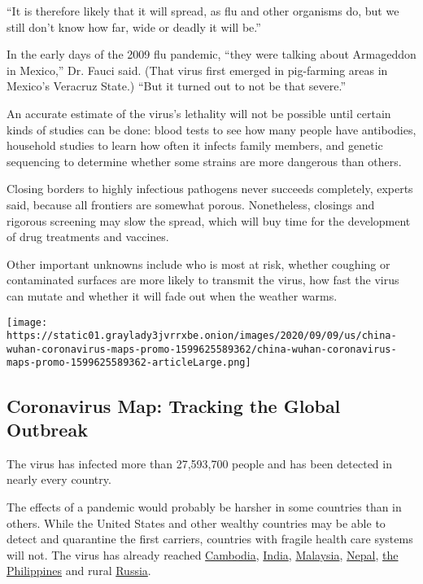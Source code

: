 ``It is therefore likely that it will spread, as flu and other organisms
do, but we still don't know how far, wide or deadly it will be.''

In the early days of the 2009 flu pandemic, ``they were talking about
Armageddon in Mexico,'' Dr. Fauci said. (That virus first emerged in
pig-farming areas in Mexico's Veracruz State.) ``But it turned out to
not be that severe.''

An accurate estimate of the virus's lethality will not be possible until
certain kinds of studies can be done: blood tests to see how many people
have antibodies, household studies to learn how often it infects family
members, and genetic sequencing to determine whether some strains are
more dangerous than others.

Closing borders to highly infectious pathogens never succeeds
completely, experts said, because all frontiers are somewhat porous.
Nonetheless, closings and rigorous screening may slow the spread, which
will buy time for the development of drug treatments and vaccines.

Other important unknowns include who is most at risk, whether coughing
or contaminated surfaces are more likely to transmit the virus, how fast
the virus can mutate and whether it will fade out when the weather
warms.

\href{https://www.nytimes3xbfgragh.onion/interactive/2020/world/coronavirus-maps.html}{}

\texttt{[image: https://static01.graylady3jvrrxbe.onion/images/2020/09/09/us/china-wuhan-coronavirus-maps-promo-1599625589362/china-wuhan-coronavirus-maps-promo-1599625589362-articleLarge.png]}

\hypertarget{coronavirus-map-tracking-the-global-outbreak}{%
\subsection{Coronavirus Map: Tracking the Global
Outbreak}\label{coronavirus-map-tracking-the-global-outbreak}}

The virus has infected more than 27,593,700 people and has been detected
in nearly every country.

The effects of a pandemic would probably be harsher in some countries
than in others. While the United States and other wealthy countries may
be able to detect and quarantine the first carriers, countries with
fragile health care systems will not. The virus has already reached
\href{https://www.phnompenhpost.com/national/first-case-coronavirus-reported-kingdom}{Cambodia},
\href{https://qz.com/india/1793841/indias-first-confirmed-case-of-coronavirus-reported-in-kerala/}{India},
\href{https://www.thestar.com.my/news/nation/2020/01/30/coronavirus-eighth-positive-case-in-m039sia-confirmed-thursday-jan-30}{Malaysia},
\href{https://www.reuters.com/article/us-china-health-nepal/nepal-confirms-first-case-of-new-coronavirus-idUSKBN1ZN1S2}{Nepal},
\href{https://www.reuters.com/article/us-china-health-philippines/philippines-confirms-first-case-of-new-coronavirus-health-minister-idUSKBN1ZT0S0}{the
Philippines} and rural
\href{https://www.themoscowtimes.com/2020/01/31/russia-reports-first-coronavirus-cases-a69123}{Russia}.

